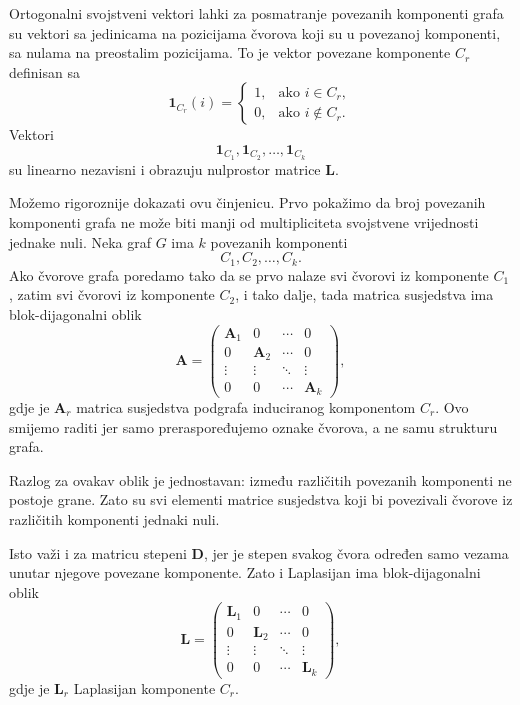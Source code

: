 Ortogonalni svojstveni vektori lahki za posmatranje povezanih komponenti grafa su vektori sa jedinicama na pozicijama čvorova koji su u povezanoj komponenti, sa nulama na preostalim pozicijama. To je vektor povezane komponente \(C_r\) definisan sa
\begin{equation}
    \mathbf{1}_{C_r}(i) =
    \begin{cases}
        1, & \text{ako } i\in C_r,\\
        0, & \text{ako } i\notin C_r.
    \end{cases}
\end{equation}
Vektori
\begin{equation}
    \mathbf{1}_{C_1},\mathbf{1}_{C_2},\ldots,\mathbf{1}_{C_k}
\end{equation}
su linearno nezavisni i obrazuju nulprostor matrice \(\mathbf{L}\).

Možemo rigoroznije dokazati ovu činjenicu. Prvo pokažimo da broj povezanih komponenti grafa ne može biti manji od multipliciteta svojstvene vrijednosti jednake nuli. Neka graf \(G\) ima \(k\) povezanih komponenti
   \begin{equation}
      C_1,C_2,\ldots,C_k.
   \end{equation}
   Ako čvorove grafa poredamo tako da se prvo nalaze svi čvorovi iz komponente \(C_1\), zatim svi
   čvorovi iz komponente \(C_2\), i tako dalje, tada matrica susjedstva ima blok-dijagonalni oblik
   \begin{equation}
   \mathbf{A} =
   \begin{pmatrix}
   \mathbf{A}_1 & 0 & \cdots & 0 \\
   0 & \mathbf{A}_2 & \cdots & 0 \\
   \vdots & \vdots & \ddots & \vdots \\
   0 & 0 & \cdots & \mathbf{A}_k
   \end{pmatrix},
   \end{equation}
   gdje je \(\mathbf{A}_r\) matrica susjedstva podgrafa induciranog komponentom \(C_r\). Ovo smijemo
 raditi jer samo preraspoređujemo oznake čvorova, a ne samu strukturu grafa.

   Razlog za ovakav oblik je jednostavan: između različitih povezanih komponenti ne postoje grane. Zato
 su svi elementi matrice susjedstva koji bi povezivali čvorove iz različitih komponenti jednaki nuli.

   Isto važi i za matricu stepeni \(\mathbf{D}\), jer je stepen svakog čvora određen samo vezama unutar
 njegove povezane komponente. Zato i Laplasijan ima blok-dijagonalni oblik
   \begin{equation}
   \mathbf{L} =
   \begin{pmatrix}
   \mathbf{L}_1 & 0 & \cdots & 0 \\
   0 & \mathbf{L}_2 & \cdots & 0 \\
   \vdots & \vdots & \ddots & \vdots \\
   0 & 0 & \cdots & \mathbf{L}_k
   \end{pmatrix},
   \end{equation}
   gdje je \(\mathbf{L}_r\) Laplasijan komponente \(C_r\).


